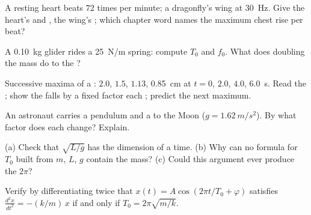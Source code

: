\begin{exercise}[$\star$]\label{exo:g12:oscillators-and-time:2}
A resting heart beats $72$ times per minute; a dragonfly's wing at
\qty{30}{Hz}. Give the heart's  and , the wing's
; which chapter word names the maximum chest rise per beat?
\end{exercise}

\begin{exercise}[$\star$]\label{exo:g12:oscillators-and-time:3}
A \qty{0.10}{kg} glider rides a \qty{25}{N/m} spring: compute $T_0$
and $f_0$. What does doubling the mass do to the ?
\end{exercise}

\begin{exercise}[$\star$]\label{exo:g12:oscillators-and-time:4}
Successive maxima of a  : $2.0$, $1.5$, $1.13$,
\qty{0.85}{cm} at $t = 0$, $2.0$, $4.0$, \qty{6.0}{s}. Read the
; show the  falls by a fixed factor each
; predict the next maximum.
\end{exercise}

\begin{exercise}[$\star$]\label{exo:g12:oscillators-and-time:5}
An astronaut carries a pendulum and a  to the
Moon ($g = \qty{1.62}{m/s^2}$). By what factor does each 
change? Explain.
\end{exercise}

\begin{exercise}[$\star\star$]\label{exo:g12:oscillators-and-time:6}
(a) Check that $\sqrt{L/g}$ has the dimension of a time. (b) Why can
no formula for $T_0$ built from $m$, $L$, $g$ contain the mass?
(c) Could this argument ever produce the $2\pi$?
\end{exercise}

\begin{exercise}[$\star\star$]\label{exo:g12:oscillators-and-time:7}
Verify by differentiating twice that $x(t) = A\cos(2\pi t/T_0 +
\varphi)$ satisfies $\frac{d^2x}{dt^2} = -(k/m)\,x$ if and only if
$T_0 = 2\pi\sqrt{m/k}$.
\end{exercise}

